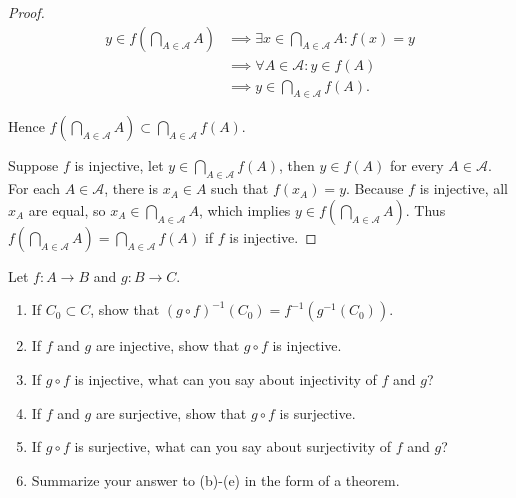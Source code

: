 \begin{proof}
    \begin{align*}
        y\in f\left(\bigcap_{A\in\mathscr{A}}A\right) & \implies \exists x\in \bigcap_{A\in\mathscr{A}}A : f(x) = y \\
                                                      & \implies \forall A\in\mathscr{A}: y\in f(A)                 \\
                                                      & \implies y\in \bigcap_{A\in\mathscr{A}}f(A).
    \end{align*}

    Hence $f\left(\bigcap_{A\in\mathscr{A}}A\right) \subset \bigcap_{A\in\mathscr{A}}f(A)$.

    Suppose $f$ is injective, let $y\in \bigcap_{A\in\mathscr{A}}f(A)$, then $y\in f(A)$ for every $A\in\mathscr{A}$. For each $A\in\mathscr{A}$, there is $x_{A}\in A$ such that $f(x_{A}) = y$. Because $f$ is injective, all $x_{A}$ are equal, so $x_{A}\in \bigcap_{A\in\mathscr{A}}A$, which implies $y\in f\left(\bigcap_{A\in\mathscr{A}}A\right)$. Thus $f\left(\bigcap_{A\in\mathscr{A}}A\right) = \bigcap_{A\in\mathscr{A}}f(A)$ if $f$ is injective.
\end{proof}

\begin{exercise}\label{chapter1:section2:exercise4}
    Let $f: A\to B$ and $g: B\to C$.
    \begin{enumerate}[label={(\alph*)}]
        \item If $C_{0}\subset C$, show that ${(g\circ f)}^{-1}(C_{0}) = f^{-1}(g^{-1}(C_{0}))$.
        \item If $f$ and $g$ are injective, show that $g\circ f$ is injective.
        \item If $g\circ f$ is injective, what can you say about injectivity of $f$ and $g$?
        \item If $f$ and $g$ are surjective, show that $g\circ f$ is surjective.
        \item If $g\circ f$ is surjective, what can you say about surjectivity of $f$ and $g$?
        \item Summarize your answer to {(b)}-{(e)} in the form of a theorem.
    \end{enumerate}
\end{exercise}

